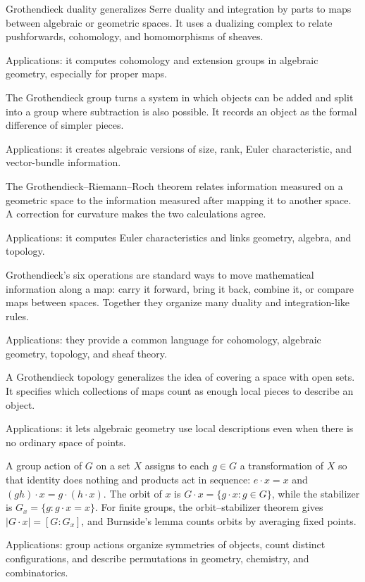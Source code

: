 Grothendieck duality generalizes Serre duality and integration by parts to maps between algebraic or geometric spaces. It uses a dualizing complex to relate pushforwards, cohomology, and homomorphisms of sheaves. \par\noindent Applications: it computes cohomology and extension groups in algebraic geometry, especially for proper maps.

The Grothendieck group turns a system in which objects can be added and split into a group where subtraction is also possible. It records an object as the formal difference of simpler pieces. \par\noindent Applications: it creates algebraic versions of size, rank, Euler characteristic, and vector-bundle information.

The Grothendieck--Riemann--Roch theorem relates information measured on a geometric space to the information measured after mapping it to another space. A correction for curvature makes the two calculations agree. \par\noindent Applications: it computes Euler characteristics and links geometry, algebra, and topology.

Grothendieck's six operations are standard ways to move mathematical information along a map: carry it forward, bring it back, combine it, or compare maps between spaces. Together they organize many duality and integration-like rules. \par\noindent Applications: they provide a common language for cohomology, algebraic geometry, topology, and sheaf theory.

A Grothendieck topology generalizes the idea of covering a space with open sets. It specifies which collections of maps count as enough local pieces to describe an object. \par\noindent Applications: it lets algebraic geometry use local descriptions even when there is no ordinary space of points.

A group action of $G$ on a set $X$ assigns to each $g\in G$ a transformation of $X$ so that identity does nothing and products act in sequence: $e\cdot x=x$ and $(gh)\cdot x=g\cdot(h\cdot x)$. The orbit of $x$ is $G\cdot x=\{g\cdot x:g\in G\}$, while the stabilizer is $G_x=\{g:g\cdot x=x\}$. For finite groups, the orbit--stabilizer theorem gives $|G\cdot x|=[G:G_x]$, and Burnside's lemma counts orbits by averaging fixed points. \par\noindent Applications: group actions organize symmetries of objects, count distinct configurations, and describe permutations in geometry, chemistry, and combinatorics.

